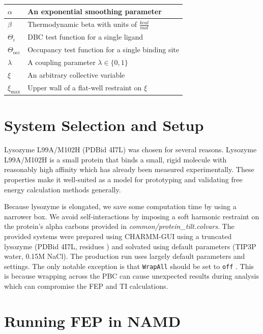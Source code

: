 \documentclass[9pt,tutorial]{Styling/livecoms}
\newcommand{\filepath}[1]{\textit{#1}}
\newcommand{\textInput}[1]{
  \texttt{#1}
}
\begin{document}
\begin{table}[H]
\begin{tabular}{  p{.26\linewidth} | p{.7\linewidth}  }
        \hline
        $\alpha$ & An exponential smoothing parameter\\
        \hline
        $\beta$ & Thermodynamic beta with units of $\frac{kcal}{mol}$\\
        \hline
        $\Theta_i$ & DBC test function for a single ligand\\
        \hline
        $\Theta_\mathrm{occ}$ & Occupancy test function for a single binding site\\
        \hline
        $\lambda$ & A coupling parameter $\lambda\in\{0,1\}$\\
        \hline
        $\xi$ & An arbitrary collective variable\\
        \hline
        $\xi_\mathrm{max}$ & Upper wall of a flat-well restraint on $\xi$\\
    \end{tabular}
\end{table}

\label{appendices}
\setcounter{section}{0}
\renewcommand\thesection{Appendix~\Alph{section}}
\renewcommand\thesubsection{\thesection.\arabic{subsection}}
\section{System Selection and Setup}\label{app:motivation}
Lysozyme L99A/M102H (PDBid 4I7L) was chosen for several reasons. Lysozyme L99A/M102H is a small protein that binds a small, rigid molecule with reasonably high affinity which has already been measured experimentally. These properties make it well-suited as a model for prototyping and validating free energy calculation methods generally. 

Because lysozyme is elongated, we save some computation time by using a narrower box. We avoid self-interactions by imposing a soft harmonic restraint on the protein's alpha carbons provided in \filepath{common/protein\_tilt.colvars}. \label{app:equilibration}
The provided systems were prepared using CHARMM-GUI\cite{Jo2008, Lee2016} using a truncated lysozyme (PDBid 4I7L, residues ) and solvated using default parameters (TIP3P water, 0.15M NaCl). 
The production run uses largely default parameters and settings. The only notable exception is that \textInput{WrapAll} should be set to \textInput{off}. 
This is because wrapping across the PBC can cause unexpected results during analysis which can compromise the FEP and TI calculations.

\section{Running FEP in NAMD}\label{app:FEPparameters}
\end{document}
